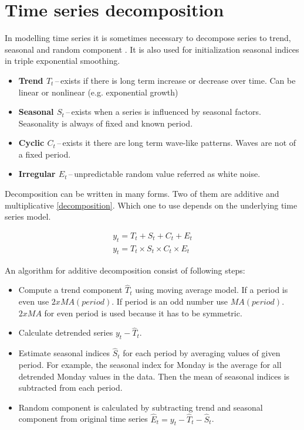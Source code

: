     \section{Time series decomposition}
    In modelling time series it is sometimes necessary to decompose series to trend, seasonal and random component
    \cite{otexts}. It is also used for initialization seasonal indices in triple exponential smoothing.

    \begin{itemize}
        \item \textbf{Trend $ T_{t} $}\,--\,exists if there is long term increase or decrease over
            time. Can be linear or nonlinear (e.g. exponential growth)
        \item \textbf{Seasonal $ S_{t} $}\,--\,exists when a series is influenced by seasonal factors.
            Seasonality is always of fixed and known period.
        \item \textbf{Cyclic $ C_{t} $}\,--\,exists it there are long term wave-like patterns.
            Waves are not of a fixed period.
        \item \textbf{Irregular $ E_{t} $}\,--\,unpredictable random value referred as white
            noise. 
    \end{itemize}

    Decomposition can be written in many forms. Two of them are additive and multiplicative \ref{decomposition}.
    Which one to use depends on the underlying time series model.

    \begin{eqnarray} \label{decomposition}
        y_{t} = T_{t} + S_{t} + C_{t} + E_{t} \\
        y_{t} = T_{t} \times S_{t} \times C_{t} \times E_{t}
    \end{eqnarray}

    An algorithm for additive decomposition consist of following steps:

    \begin{itemize}
        \item Compute a trend component $\hat{T}_t$ using moving average model. If a period is even use
        $2 x MA(period)$. If period is an odd number use $MA(period)$. $2 x MA$ for even period is used because it
        has to be symmetric.
        \item Calculate detrended series $y_t - \hat{T}_t$.
        \item Estimate seasonal indices $\hat{S}_t$ for each period by averaging values of given period. For example,
         the seasonal index for Monday is the average for all detrended Monday values in the data. Then the mean of
         seasonal indices is subtracted from each period.
        \item Random component is calculated by subtracting trend and seasonal component from original time series
            $\hat{E}_t = y_t - \hat{T}_t - \hat{S}_t$.
    \end{itemize}

